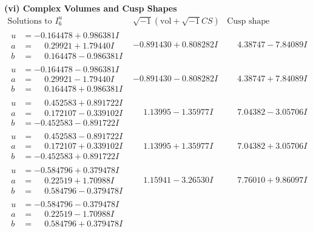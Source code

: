 \documentclass[1p]{elsarticle_modified}
\theoremstyle{definition}
\newcommand{\I}{\sqrt{-1}}
\begin{document}
\newpage\flushleft \textbf{(vi) Complex Volumes and Cusp Shapes}
$$\begin{array}{c|c|c}  
\text{Solutions to }I^u_{6}& \I (\text{vol} + \sqrt{-1}CS) & \text{Cusp shape}\\
 \hline 
\begin{aligned}
u &= -0.164478 + 0.986381 I \\
a &= \phantom{-}0.29921 + 1.79440 I \\
b &= \phantom{-}0.164478 - 0.986381 I\end{aligned}
 & -0.891430 + 0.808282 I & \phantom{-}4.38747 - 7.84089 I \\ \hline\begin{aligned}
u &= -0.164478 - 0.986381 I \\
a &= \phantom{-}0.29921 - 1.79440 I \\
b &= \phantom{-}0.164478 + 0.986381 I\end{aligned}
 & -0.891430 - 0.808282 I & \phantom{-}4.38747 + 7.84089 I \\ \hline\begin{aligned}
u &= \phantom{-}0.452583 + 0.891722 I \\
a &= \phantom{-}0.172107 - 0.339102 I \\
b &= -0.452583 - 0.891722 I\end{aligned}
 & \phantom{-}1.13995 - 1.35977 I & \phantom{-}7.04382 - 3.05706 I \\ \hline\begin{aligned}
u &= \phantom{-}0.452583 - 0.891722 I \\
a &= \phantom{-}0.172107 + 0.339102 I \\
b &= -0.452583 + 0.891722 I\end{aligned}
 & \phantom{-}1.13995 + 1.35977 I & \phantom{-}7.04382 + 3.05706 I \\ \hline\begin{aligned}
u &= -0.584796 + 0.379478 I \\
a &= \phantom{-}0.22519 + 1.70988 I \\
b &= \phantom{-}0.584796 - 0.379478 I\end{aligned}
 & \phantom{-}1.15941 - 3.26530 I & \phantom{-}7.76010 + 9.86097 I \\ \hline\begin{aligned}
u &= -0.584796 - 0.379478 I \\
a &= \phantom{-}0.22519 - 1.70988 I \\
b &= \phantom{-}0.584796 + 0.379478 I\end{aligned}

\end{array}$$
\end{document}
